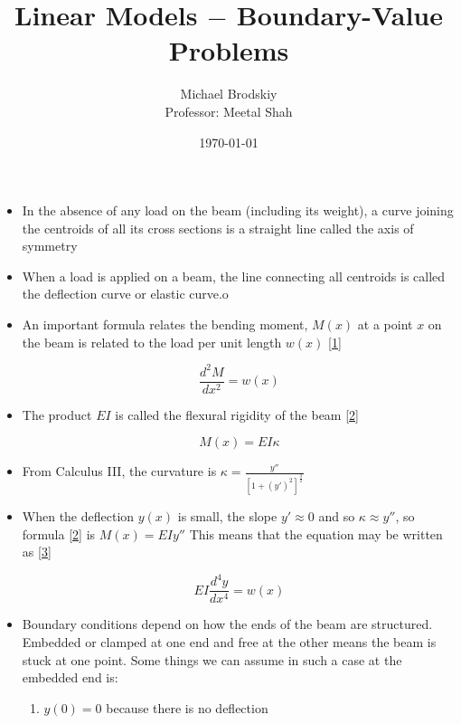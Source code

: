 \documentclass[12pt]{article}
\title{Linear Models $-$ Boundary-Value Problems}
\date{\today}
\author{Michael Brodskiy\\ \small Professor: Meetal Shah}
\begin{document}
\maketitle

\begin{itemize}

  \item In the absence of any load on the beam (including its weight), a curve joining the centroids of all its cross sections is a straight line called the axis of symmetry

  \item When a load is applied on a beam, the line connecting all centroids is called the deflection curve or elastic curve.o

  \item An important formula relates the bending moment, $M(x)$ at a point $x$ on the beam is related to the load per unit length $w(x)$ \eqref{1}

    \begin{equation}
      \frac{d^2M}{dx^2}=w(x)
      \label{1}
    \end{equation}

  \item The product $EI$ is called the flexural rigidity of the beam \eqref{2}

    \begin{equation}
      M(x)=EI\kappa
      \label{2}
    \end{equation}

  \item From Calculus III, the curvature is $\kappa=\frac{y''}{[1+(y')^2]^{\frac{3}{2}}}$

    \item When the deflection $y(x)$ is small, the slope $y'\approx0$ and so $\kappa\approx y''$, so formula \eqref{2} is $M(x)=EIy''$ This means that the equation may be written as \eqref{3}

      \begin{equation}
        EI\frac{d^4y}{dx^4}=w(x)
        \label{3}
      \end{equation}

    \item Boundary conditions depend on how the ends of the beam are structured. Embedded or clamped at one end and free at the other means the beam is stuck at one point. Some things we can assume in such a case at the embedded end is:

      \begin{enumerate}
        \item $y(0)=0$ because there is no deflection


\end{enumerate}
\end{itemize}
\end{document}
